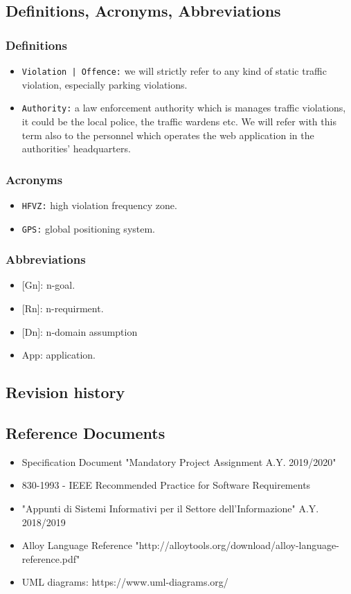 \documentclass[12pt,a4paper]{article}
\begin{document}
\subsection{Definitions,	Acronyms,	Abbreviations} 
\subsubsection{Definitions}
 \begin{itemize}
\item \texttt{Violation | Offence:} we will strictly refer to any kind of static traffic violation, especially parking violations. 
\item \texttt{Authority:} a law enforcement authority which is manages traffic violations, it could be the local police, the traffic wardens etc. We will refer with this term also to the personnel which operates the web application in the authorities' headquarters.
\end{itemize}
\subsubsection{Acronyms}
\begin{itemize}
\item \texttt{HFVZ:} high violation frequency zone.
\item \texttt{GPS:} global positioning system.
\end{itemize}
\subsubsection{Abbreviations}
\begin{itemize}
				\item {[Gn]}: n-goal.
				\item {[Rn]}: n-requirment.
				\item {[Dn]}: n-domain assumption
				\item {App}: application.
			\end{itemize}
\subsection{Revision history} 
\subsection{Reference	Documents} 
\begin{itemize}
				\item Specification Document "Mandatory Project Assignment A.Y. 2019/2020"
				\item 830-1993 - IEEE Recommended Practice for Software Requirements
				\item "Appunti di Sistemi Informativi per il Settore dell'Informazione" A.Y. 2018/2019
				\item Alloy Language Reference "http://alloytools.org/download/alloy-language-reference.pdf"
				\item UML diagrams: https://www.uml-­diagrams.org/
			\end{itemize}
\end{document}
